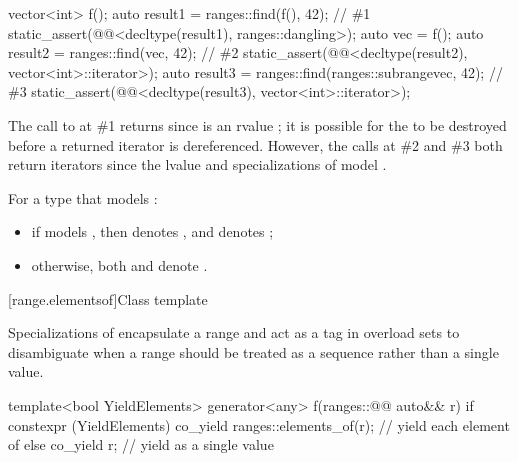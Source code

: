 \pnum
\begin{example}
\begin{codeblock}
vector<int> f();
auto result1 = ranges::find(f(), 42);                                   // \#1
static_assert(@@<decltype(result1), ranges::dangling>);
auto vec = f();
auto result2 = ranges::find(vec, 42);                                   // \#2
static_assert(@@<decltype(result2), vector<int>::iterator>);
auto result3 = ranges::find(ranges::subrange{vec}, 42);                 // \#3
static_assert(@@<decltype(result3), vector<int>::iterator>);
\end{codeblock}
The call to  at \#1 returns 
since  is an rvalue ;
it is possible for the  to be destroyed
before a returned iterator is dereferenced.
However, the calls at \#2 and \#3 both return iterators
since the lvalue  and specializations of 
model .
\end{example}

\pnum
For a type  that models :
\begin{itemize}
\item
if  models , then
 denotes , and
 denotes ;
\item
otherwise,
both  and 
denote .
\end{itemize}

[range.elementsof]{Class template }

Specializations of  encapsulate a range and
act as a tag in overload sets to disambiguate
when a range should be treated as a sequence
rather than a single value.

\begin{example}
\begin{codeblock}
template<bool YieldElements>
generator<any> f(ranges::@@ auto&& r) {
  if constexpr (YieldElements)
    co_yield ranges::elements_of(r);        // yield each element of 
  else
    co_yield r;                             // yield  as a single value
}
\end{codeblock}
\end{example}

